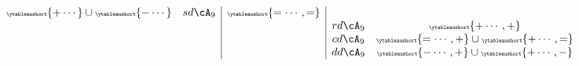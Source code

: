 \documentclass[12pt,a4paper]{amsart}
\def\abs#1{\left|{#1}\right|}
\numberwithin{equation}{section}
\theoremstyle{remark}
\def\LLS{\mathrm{{}^{\ell} LS}}
\let\ytb=\ytableaushort
\newcommand{\tytb}[1]{{\tiny\ytb{#1}}}
\def\cOpp{\cO^{\prime\prime}}
\def\pcL{\cL^+}
\def\ncL{\cL^-}
\def\uptaupp{\uptau^{\prime\prime}}
\begin{document}
\begin{equation}
\begin{array}{cc|c|cc}
                                                            \tytb{+\cdots} \cup\tytb{-\cdots}    & sd\cA_{9} & \tytb{=\cdots,=}                 \\
                        &                    &                & rd\cA_{9} &\tytb{+\cdots,+}                                   \\
                        &                    &                & cd\cA_{9} &\tytb{=\cdots,+}  \cup \tytb{+\cdots,=}                \\
                        &                    &                & dd\cA_{9} &\tytb{-\cdots,+} \cup \tytb{+\cdots,-}                       \\
\end{array}
\end{equation}











\end{document}

